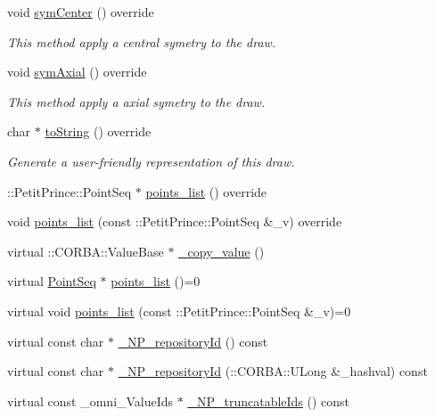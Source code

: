 \begin{DoxyCompactItemize}
void \hyperlink{class_polygon_a9e8a5e056a85743e44464c5b56506b8e}{sym\+Center} () override
\begin{DoxyCompactList}\small\item\em This method apply a central symetry to the draw. \end{DoxyCompactList}\item 
void \hyperlink{class_polygon_abbf307ac7f2414e8d9478b52361344a7}{sym\+Axial} () override
\begin{DoxyCompactList}\small\item\em This method apply a axial symetry to the draw. \end{DoxyCompactList}\item 
char $\ast$ \hyperlink{class_polygon_a6b3f4fe63c52723e139ee65c8e0010b5}{to\+String} () override
\begin{DoxyCompactList}\small\item\em Generate a user-\/friendly representation of this draw. \end{DoxyCompactList}\item 
\+::Petit\+Prince\+::\+Point\+Seq $\ast$ \hyperlink{class_polygon_ac4696400cdaea4ebc21aaf5c3d078821}{points\+\_\+list} () override
\item 
void \hyperlink{class_polygon_ae706ff7bf668b0217f6d83fae581cda7}{points\+\_\+list} (const \+::Petit\+Prince\+::\+Point\+Seq \&\+\_\+v) override
\item 
virtual \+::C\+O\+R\+B\+A\+::\+Value\+Base $\ast$ \hyperlink{class_polygon_a888040e806bf0a66186281a89bfd1e50}{\+\_\+copy\+\_\+value} ()
\item 
virtual \hyperlink{class_point_seq}{Point\+Seq} $\ast$ \hyperlink{class_polygon_a09ff655ef2cb86362832e68bf5f2d74a}{points\+\_\+list} ()=0
\item 
virtual void \hyperlink{class_polygon_aac9733780aeb82d8c52a3782d6ac9ea1}{points\+\_\+list} (const \+::Petit\+Prince\+::\+Point\+Seq \&\+\_\+v)=0
\item 
virtual const char $\ast$ \hyperlink{class_polygon_a95a6b4967ce579d1405de9061a7c7b91}{\+\_\+\+N\+P\+\_\+repository\+Id} () const 
\item 
virtual const char $\ast$ \hyperlink{class_polygon_a52b08c50329f4d0c8c89eacede7a2adc}{\+\_\+\+N\+P\+\_\+repository\+Id} (\+::C\+O\+R\+B\+A\+::\+U\+Long \&\+\_\+hashval) const 
\item 
virtual const \+\_\+omni\+\_\+\+Value\+Ids $\ast$ \hyperlink{class_polygon_a169c4ae5faf3b5d8514cd4aa5ccf8a47}{\+\_\+\+N\+P\+\_\+truncatable\+Ids} () const 
\item 

\end{DoxyCompactItemize}
